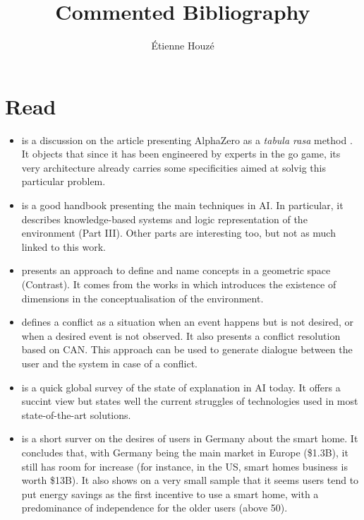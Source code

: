 \documentclass{article}
\title{Commented Bibliography}
\author{\'Etienne Houzé}
\date{}
\begin{document}
\maketitle
    \section{Read}
    \begin{itemize}
    \item \citep{marcus2018innateness} is a discussion on the article presenting AlphaZero as a \emph{tabula rasa} method \citep{silver2017mastering}. It objects that since it has been engineered by experts in the go game, its very architecture already carries some specificities aimed at solvig this particular problem.

    \item\citep{russell2016artificial} is a good handbook presenting the main techniques in AI. In particular, it describes knowledge-based systems and logic representation of the environment (Part III). Other parts are interesting too, but not as much linked to this work.

    \item\citep{dessalles2015conceptual}  presents an approach to define and name concepts in a geometric space (Contrast). It comes from the works in \citep{gardenfors2004conceptual} which introduces the existence of dimensions in the conceptualisation of the environment.

    \item\citep{dessalles2008computational} defines a conflict as a situation when an event happens but is not desired, or when a desired event is not observed. It also presents a conflict resolution based on CAN. This approach can be used to generate dialogue between the user and the system in case of a conflict.

    \item\citep{dovsilovic2018explainable} is a quick global survey of the state of explanation in AI today. It offers a succint view but states well the current struggles of technologies used in most state-of-the-art solutions.

    \item\citep{zimmermann2017user} is a short surver on the desires of users in Germany about the smart home. It concludes that, with Germany being the main market in Europe (\$1.3B), it still has room for increase (for instance, in the US, smart homes business is worth \$13B). It also shows on a very small sample that it seems users tend to put energy savings as the first incentive to use a smart home, with a predominance of independence for the older users (above 50).


\end{itemize}
\end{document}
